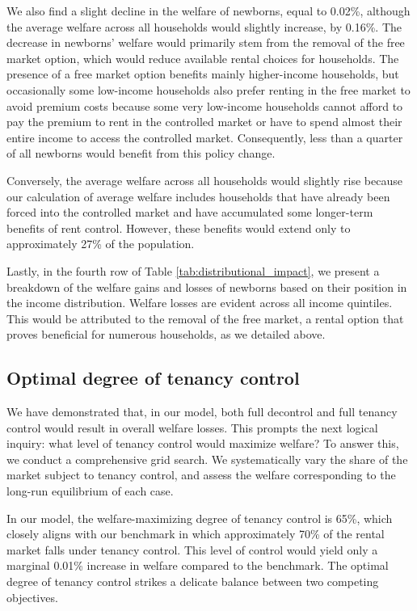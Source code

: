 \documentclass[parskip=full]{article}
\begin{document}
We also find a slight decline in the welfare of newborns, equal to 0.02\%, although the average welfare across all households would slightly increase, by 0.16\%. The decrease in newborns' welfare would primarily stem from the removal of the free market option, which would reduce available rental choices for households. The presence of a free market option benefits mainly higher-income households, but occasionally some low-income households also prefer renting in the free market to avoid premium costs because some very low-income households cannot afford to pay the premium to rent in the controlled market or have to spend almost their entire income to access the controlled market. Consequently, less than a quarter of all newborns would benefit from this policy change.

Conversely, the average welfare across all households would slightly rise because our calculation of average welfare includes households that have already been forced into the controlled market and have accumulated some longer-term benefits of rent control. However, these benefits would extend only to approximately 27\% of the population.

Lastly, in the fourth row of Table \ref{tab:distributional_impact}, we present a breakdown of the welfare gains and losses of newborns based on their position in the income distribution. Welfare losses are evident across all income quintiles. This would be attributed to the removal of the free market, a rental option that proves beneficial for numerous households, as we detailed above.

\subsection{Optimal degree of tenancy control}\label{subsection:optimal_control}

We have demonstrated that, in our model, both full decontrol and full tenancy control would result in overall welfare losses. This prompts the next logical inquiry: what level of tenancy control would maximize welfare? To answer this, we conduct a comprehensive grid search. We systematically vary the share of the market subject to tenancy control, and assess the welfare corresponding to the long-run equilibrium of each case.

In our model, the welfare-maximizing degree of tenancy control is 65\%, which closely aligns with our benchmark in which approximately 70\% of the rental market falls under tenancy control. This level of control would yield only a marginal 0.01\% increase in welfare compared to the benchmark. The optimal degree of tenancy control strikes a delicate balance between two competing objectives.
\end{document}
